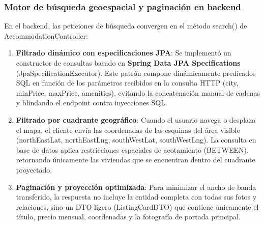 \subsubsection{Motor de búsqueda geoespacial y paginación en backend}

En el backend, las peticiones de búsqueda convergen en el método search() de AccommodationController:

\begin{enumerate}
    \item \textbf{Filtrado dinámico con especificaciones JPA}: Se implementó un constructor de consultas basado en \textbf{Spring Data JPA Specifications} (JpaSpecificationExecutor). Este patrón compone dinámicamente predicados SQL en función de los parámetros recibidos en la consulta HTTP (city, minPrice, maxPrice, amenities), evitando la concatenación manual de cadenas y blindando el endpoint contra inyecciones SQL.
    \item \textbf{Filtrado por cuadrante geográfico}: Cuando el usuario navega o desplaza el mapa, el cliente envía las coordenadas de las esquinas del área visible (northEastLat, northEastLng, southWestLat, southWestLng). La consulta en base de datos aplica restricciones espaciales de acotamiento (BETWEEN), retornando únicamente las viviendas que se encuentran dentro del cuadrante proyectado.
    \item \textbf{Paginación y proyección optimizada}: Para minimizar el ancho de banda transferido, la respuesta no incluye la entidad completa con todas sus fotos y relaciones, sino un DTO ligero (ListingCardDTO) que contiene únicamente el título, precio mensual, coordenadas y la fotografía de portada principal.
\end{enumerate}


